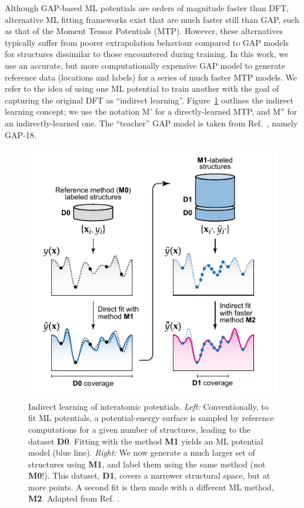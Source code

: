 \documentclass[12pt,a4paper,twoside,nobind]{ociamthesis}
\begin{document}
Although GAP-based ML potentials are orders of magnitude faster than DFT, alternative ML fitting frameworks exist that are much faster still than GAP,
such as that of the Moment Tensor Potentials (MTP).\autocite{Shapeev2016,Podryabinkin2017}
However, these alternatives typically suffer from poorer extrapolation behaviour compared to GAP models for structures dissimilar to those encountered during training.\autocite{Rosenbrock2021}
In this work, we use an accurate, but more computationally expensive GAP model to generate reference data (locations and labels) for a series of much faster MTP models.\autocite{Morrow2022}
We refer to the idea of using one ML potential to train another with the goal of capturing the original DFT as ``indirect learning''. Figure\ \ref{fig:schematic} outlines the indirect learning concept;
we use the notation $\mathrm{M'}$ for a directly-learned MTP, and $\mathrm{M''}$ for an indirectly-learned one. The ``teacher'' GAP model is taken from Ref.\ \cite{Bartok2018}, namely GAP-18.

\begin{figure}[ht]
  \includegraphics[width=0.6\linewidth]{schematic.pdf}
  \centering
  \caption{
  Indirect learning of interatomic potentials. 
  \textit{Left:} 
  Conventionally, to fit ML potentials, a potential-energy surface is sampled by reference computations
  for a given number of structures, leading to the dataset \textbf{D0}.
  Fitting with the method \textbf{M1} yields an ML potential model (blue line).
  \textit{Right:}
  We now generate a much larger set of structures using \textbf{M1}, and label them using the same method (not \textbf{M0}!).
  This dataset, \textbf{D1}, covers a narrower structural space, but at more points.
  A second fit is then made with a different ML method, \textbf{M2}. Adapted from Ref. \cite{Morrow2022}.
  }
  \label{fig:schematic}
\end{figure}
\end{document}

